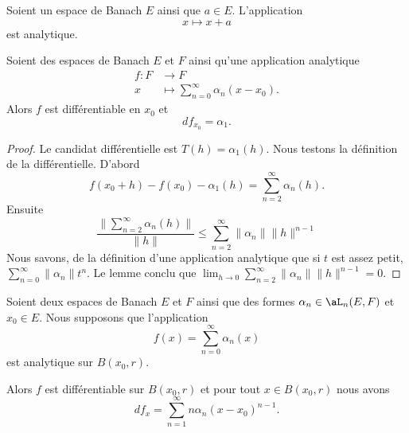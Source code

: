 \begin{proposition}	\label{PROPooFEMWooDwAYyO}
	Soient un espace de Banach \( E\) ainsi que \( a\in E\). L'application
	\begin{equation}
		x\mapsto x+a
	\end{equation}
	est analytique.
\end{proposition}


\begin{lemma}	\label{LEMooVIINooOUwAUQ}
	Soient des espaces de Banach \( E\) et \( F\) ainsi qu'une application analytique
	\begin{equation}
		\begin{aligned}
			f\colon F & \to F                                       \\
			x         & \mapsto \sum_{n=0}^{\infty}\alpha_n(x-x_0).
		\end{aligned}
	\end{equation}
	Alors \( f\) est différentiable en \( x_0\) et
	\begin{equation}
		df_{x_0}=\alpha_1.
	\end{equation}
\end{lemma}

\begin{proof}
	Le candidat différentielle est \( T(h)=\alpha_1(h)\). Nous testons la définition de la différentielle. D'abord
	\begin{equation}
		f(x_0+h)-f(x_0)-\alpha_1(h)=\sum_{n=2}^{\infty}\alpha_n(h).
	\end{equation}
	Ensuite
	\begin{equation}
		\frac{ \| \sum_{n=2}^{\infty}\alpha_n(h) \| }{ \| h \| }\leq\sum_{n=2}^{\infty}\| \alpha_n \|\| h \|^{n-1}
	\end{equation}
	Nous savons, de la définition d'une application analytique que si \( t\) est assez petit, \( \sum_{n=0}^{\infty}\| \alpha_n \|t^{n}\). Le lemme conclu que \( \lim_{h\to 0}\sum_{n=2}^{\infty}\| \alpha_n \|\| h \|^{n-1}=0\).
\end{proof}


\begin{theorem}	\label{THOooCESLooZxAzOg}
	Soient deux espaces de Banach \( E\) et \( F\) ainsi que des formes \( \alpha_n\in\aL_n(E,F)\) et \( x_0\in E\). Nous supposons que l'application
	\begin{equation}
		f(x)=\sum_{n=0}^{\infty}\alpha_n(x)
	\end{equation}
	est analytique sur \( B(x_0,r)\).

	Alors \( f\) est différentiable sur \( B(x_0,r)\) et pour tout \( x\in B(x_0,r)\) nous avons
	\begin{equation}
		df_x=\sum_{n=1}^{\infty}n\alpha_n(x-x_0)^{n-1}.
	\end{equation}
\end{theorem}

